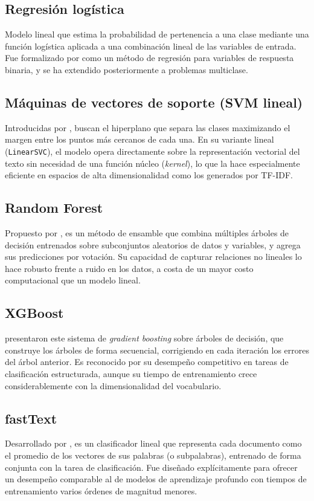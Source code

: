 \subsection{Regresión logística}
Modelo lineal que estima la probabilidad de pertenencia a una clase mediante una función logística aplicada a una combinación lineal de las variables de entrada. Fue formalizado por  como un método de regresión para variables de respuesta binaria, y se ha extendido posteriormente a problemas multiclase.

\subsection{Máquinas de vectores de soporte (SVM lineal)}
Introducidas por , buscan el hiperplano que separa las clases maximizando el margen entre los puntos más cercanos de cada una. En su variante lineal (\texttt{LinearSVC}), el modelo opera directamente sobre la representación vectorial del texto sin necesidad de una función núcleo (\textit{kernel}), lo que la hace especialmente eficiente en espacios de alta dimensionalidad como los generados por TF-IDF.

\subsection{Random Forest}
Propuesto por , es un método de ensamble que combina múltiples árboles de decisión entrenados sobre subconjuntos aleatorios de datos y variables, y agrega sus predicciones por votación. Su capacidad de capturar relaciones no lineales lo hace robusto frente a ruido en los datos, a costa de un mayor costo computacional que un modelo lineal.

\subsection{XGBoost}
 presentaron este sistema de \textit{gradient boosting} sobre árboles de decisión, que construye los árboles de forma secuencial, corrigiendo en cada iteración los errores del árbol anterior. Es reconocido por su desempeño competitivo en tareas de clasificación estructurada, aunque su tiempo de entrenamiento crece considerablemente con la dimensionalidad del vocabulario.

\subsection{fastText}
Desarrollado por , es un clasificador lineal que representa cada documento como el promedio de los vectores de sus palabras (o subpalabras), entrenado de forma conjunta con la tarea de clasificación. Fue diseñado explícitamente para ofrecer un desempeño comparable al de modelos de aprendizaje profundo con tiempos de entrenamiento varios órdenes de magnitud menores.

